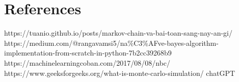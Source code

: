 \documentclass[conference]{IEEEtran}
\begin{document}
\section*{References}
\begin{thebibliography}{00}
 https://tuanio.github.io/posts/markov-chain-va-bai-toan-sang-nay-an-gi/
 https://medium.com/@rangavamsi5/na\%C3\%AFve-bayes-algorithm-implementation-from-scratch-in-python-7b2cc39268b9
 https://machinelearningcoban.com/2017/08/08/nbc/
 https://www.geeksforgeeks.org/what-is-monte-carlo-simulation/
 chatGPT 
\end{thebibliography}
\end{document}
